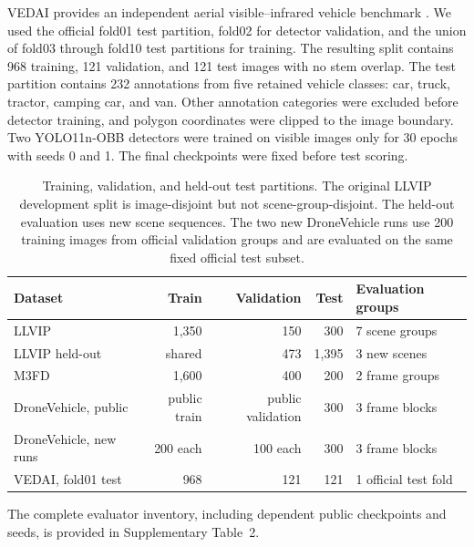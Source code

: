 \documentclass[preprint,11pt]{elsarticle}
\begin{document}
VEDAI provides an independent aerial visible--infrared vehicle benchmark
\cite{razakarivony2016vedai}. We used the official fold01 test partition,
fold02 for detector validation, and the union of fold03 through fold10 test
partitions for training. The resulting split contains 968 training, 121
validation, and 121 test images with no stem overlap. The test partition
contains 232 annotations from five retained vehicle classes: car, truck,
tractor, camping car, and van. Other annotation categories were excluded
before detector training, and polygon coordinates were clipped to the image
boundary. Two YOLO11n-OBB detectors were trained on visible images only for 30
epochs with seeds 0 and 1. The final checkpoints were fixed before test
scoring.

\begin{table}[t]
\centering
\small
\caption{Training, validation, and held-out test partitions. The original
LLVIP development split is image-disjoint but not scene-group-disjoint. The
held-out evaluation uses new scene sequences. The two new DroneVehicle
runs use 200 training images from official validation groups and are evaluated
on the same fixed official test subset.}
\label{tab:data}
\begin{tabular}{@{}lrrrl@{}}
\toprule
Dataset & Train & Validation & Test & Evaluation groups \\
\midrule
LLVIP & 1,350 & 150 & 300 & 7 scene groups \\
LLVIP held-out & shared & 473 & 1,395 & 3 new scenes \\
M3FD & 1,600 & 400 & 200 & 2 frame groups \\
DroneVehicle, public & public train & public validation & 300 & 3 frame blocks \\
DroneVehicle, new runs & 200 each & 100 each & 300 & 3 frame blocks \\
VEDAI, fold01 test & 968 & 121 & 121 & 1 official test fold \\
\bottomrule
\end{tabular}
\end{table}

The complete evaluator inventory, including dependent public checkpoints and
seeds, is provided in Supplementary Table~2.
\end{document}
